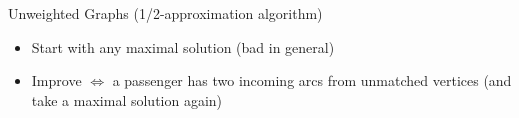\begin{frame}{Unweighted Graphs (1/2-approximation algorithm)}
\begin{itemize}
  \item<1-3> Start with any maximal solution (bad in general)
  \item<4> Improve $\iff$ a passenger has two incoming arcs from unmatched
  vertices (and take a maximal solution again)
\end{itemize}
\centering

\end{frame}